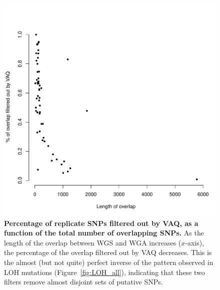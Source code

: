 \documentclass[11pt]{article} %
\begin{document}
\begin{figure}
\centerline{
\includegraphics[width=5in]{./LOH_VAQ/VAQ_all.pdf} }
\caption{ \textbf{Percentage of replicate SNPs filtered out by VAQ, as a function of the total number of overlapping SNPs.} As the length of the overlap between WGS and WGA increases ($x$-axis), the percentage of the overlap filtered out by VAQ decreases. This is the almost (but not quite) perfect inverse of the pattern observed in LOH mutations (Figure~\ref{fig:LOH_all}), indicating that these two filters remove almost disjoint sets of putative SNPs.}
\label{fig:VAQ_all}
\end{figure}
\end{document}
